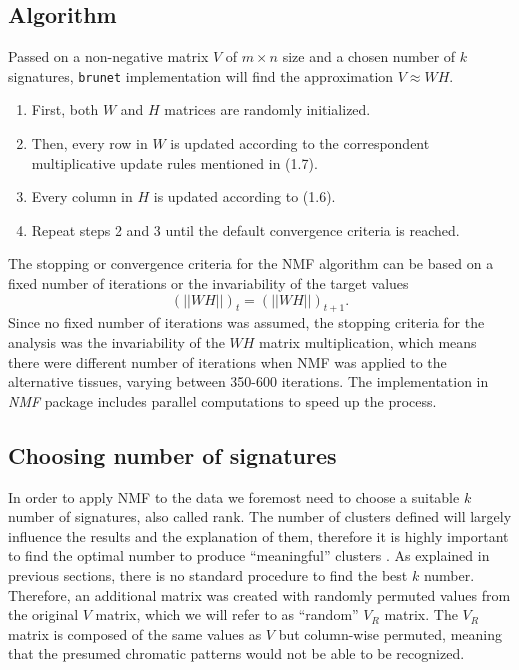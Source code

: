 \subsection{Algorithm}

Passed on a non-negative matrix \(V\) of \(m \times n\) size and a chosen number of \(k\) signatures, \texttt{brunet} implementation will find the approximation \(V \approx WH\).

\begin{enumerate}
    \item First, both \(W\) and \(H\) matrices are randomly initialized.
    \item Then, every row in \(W\) is updated according to the correspondent multiplicative update rules mentioned in (1.7).
    \item Every column in \(H\) is updated according to (1.6).
    \item Repeat steps 2 and 3 until the default convergence criteria is reached.
\end{enumerate}

The stopping or convergence criteria for the NMF algorithm can be based on a fixed number of iterations or the invariability of the target values \[( \vert \vert WH \vert \vert  )_t = ( \vert \vert WH \vert \vert  )_{t+1}.\] Since no fixed number of iterations was assumed, the stopping criteria for the analysis was the invariability of the \(WH\) matrix multiplication, which means there were different number of iterations when NMF was applied to the alternative tissues, varying between 350-600 iterations. The implementation in \textit{NMF} package includes parallel computations to speed up the process.


\subsection{Choosing number of signatures}

In order to apply NMF to the data we foremost need to choose a suitable \(k\) number of signatures, also called rank. The number of clusters defined will largely influence the results and the explanation of them, therefore it is highly important to find the optimal number to produce ``meaningful'' clusters \cite{Brunet2004}. As explained in previous sections, there is no standard procedure to find the best \(k\) number. Therefore, an additional matrix was created with randomly permuted values from the original \(V\) matrix, which we will refer to as ``random'' \(V_R\) matrix. The \(V_R\) matrix is composed of the same values as \(V\) but column-wise permuted, meaning that the presumed chromatic patterns would not be able to be recognized.

